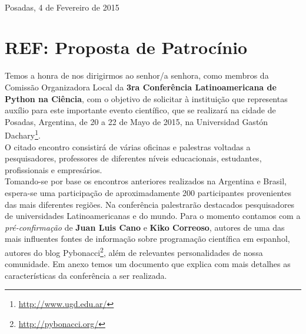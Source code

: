 \documentclass[11pt,a4paper]{report}
\begin{document}
\begin{center}
\end{center}



\hfill \\ Posadas, 4 de Fevereiro de 2015\\[0.1cm]

\section*{REF: Proposta de Patrocínio}

Temos a honra de nos dirigirmos ao senhor/a senhora, como membros da Comissão Organizadora Local da 
\textbf{3ra Conferência Latinoamericana de Python na Ciência}, com o objetivo de solicitar 
à instituição que representas auxílio para este importante evento científico, que se realizará na cidade
de Posadas, Argentina, de 20 a 22 de Mayo de 2015, na Universidad Gastón Dachary\footnote{\url{http://www.ugd.edu.ar/}}. \\[0.1cm]

O citado encontro consistirá de várias oficinas e palestras voltadas a
pesquisadores, professores de diferentes níveis educacionais,
estudantes, profissionais e empresários. \\[0.1cm]

Tomando-se por base os encontros anteriores realizados na Argentina e
Brasil, espera-se uma participação de aproximadamente 200 participantes
provenientes das mais diferentes regiões. Na conferência
palestrarão destacados pesquisadores de universidades Latinoamericanas e
do mundo. Para o momento contamos com a \emph{pré-confirmação} de
\textbf{Juan Luis Cano} e \textbf{Kiko Correoso}, autores de uma das
mais influentes fontes de informação sobre programação científica em espanhol,
autores do blog Pybonacci\footnote{\url{http://pybonacci.org/}}, além
de relevantes personalidades de nossa comunidade. Em anexo temos um documento
que explica com mais detalhes as características da
conferência a ser realizada.\\[0.1cm]
\end{document}
